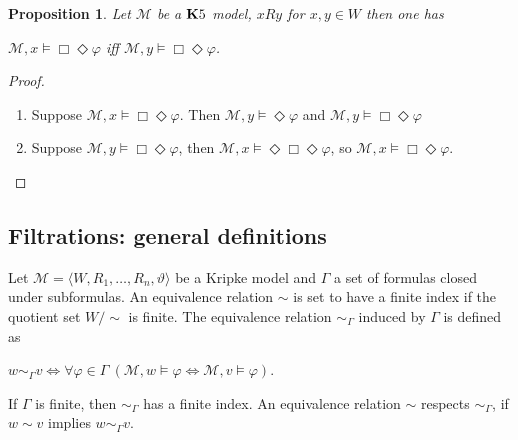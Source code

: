 \documentclass[a4paper]{article}
\theoremstyle{defin}
\theoremstyle{theorem}
\theoremstyle{prop}
\newtheorem{prop}{Proposition}
\theoremstyle{lemma}
\theoremstyle{ex}
\theoremstyle{col}
\begin{document}
\begin{prop} \label{k5useful}
  Let $\mathcal{M}$ be a ${\bf K}5$ model, $x R y$ for $x, y \in W$ then one has
  \begin{center}
    $\mathcal{M}, x \models \Box \Diamond \varphi$ iff $\mathcal{M}, y \models \Box \Diamond \varphi$.
  \end{center}
\end{prop}

\begin{proof}
$ $

  \begin{enumerate}
    \item Suppose $\mathcal{M}, x \models \Box \Diamond \varphi$. Then $\mathcal{M}, y \models \Diamond \varphi$ and $\mathcal{M}, y \models \Box \Diamond \varphi$
    \item Suppose $\mathcal{M}, y \models \Box \Diamond \varphi$, then $\mathcal{M}, x \models \Diamond \Box \Diamond \varphi$, so $\mathcal{M}, x \models \Box \Diamond \varphi$.
  \end{enumerate}
\end{proof}

\subsection{Filtrations: general definitions}

Let $\mathcal{M} = \langle W, R_1, \dots, R_n, \vartheta \rangle$ be a Kripke model and $\Gamma$ a set of formulas closed under subformulas. An equivalence relation $\sim$ is set to have a finite index if the quotient set $W / \sim$ is finite. The equivalence relation $\sim_{\Gamma}$ induced by $\Gamma$ is defined as

\begin{center}
  $w \sim_{\Gamma} v \Leftrightarrow \forall \varphi \in \Gamma \: (\mathcal{M}, w \models \varphi \Leftrightarrow \mathcal{M}, v \models \varphi)$.
\end{center}

If $\Gamma$ is finite, then $\sim_{\Gamma}$ has a finite index. An equivalence relation $\sim$ respects $\sim_{\Gamma}$, if $w \sim v$ implies $w \sim_{\Gamma} v$.
\end{document}
